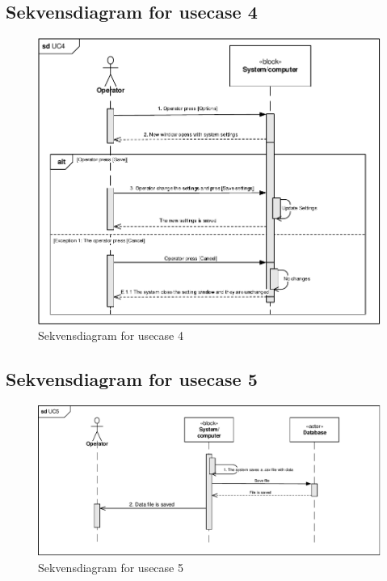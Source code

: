 \subsection{Sekvensdiagram for usecase 4} 
\begin{figure}[H]
	\centering
	\includegraphics[width=1\textwidth]{pdf/UC4_cropped.pdf}
	\caption{Sekvensdiagram for usecase 4}
	\label{fig:uc1}
\end{figure}

\subsection{Sekvensdiagram for usecase 5} 
\begin{figure}[H]
	\centering
	\includegraphics[width=1\textwidth]{pdf/UC5_cropped.pdf}
	\caption{Sekvensdiagram for usecase 5}
	\label{fig:uc1}
\end{figure}

